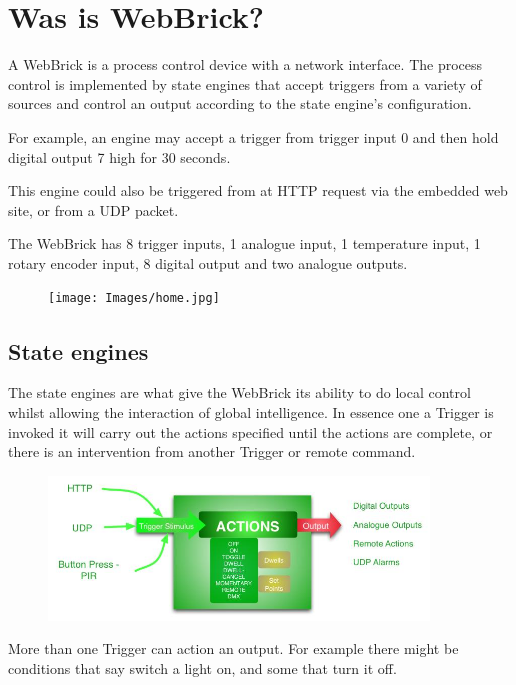 \section {Was is WebBrick?}

A WebBrick is a process control device with a network interface.  The process control is implemented by state engines that accept
triggers  from a variety of sources and control an output according to the state engine's configuration.

For example, an engine may accept a trigger from trigger input 0 and then hold digital output 7 high for 30 seconds.

This engine could also be triggered from at HTTP request via the embedded web site, or from a UDP packet.

The WebBrick has 8 trigger inputs, 1 analogue input, 1 temperature input, 1 rotary encoder input, 8 digital output and two analogue outputs.

\begin{figure}[H]
\centering
\texttt{[image: Images/home.jpg]}
\end{figure}

\subsection{State engines}


    The state engines are what give the WebBrick its ability to do local control whilst allowing the interaction of global intelligence.  In essence one a Trigger is invoked it will carry out the actions specified until the actions are complete, or there is an intervention from another Trigger or remote command.
    
    \begin{figure}[H]
    \centering
    \includegraphics[width=0.9\textwidth]{Images/StateEngineDiag.jpg}
    \end{figure}
    
    More than one Trigger can action an output.  For example there might be conditions that say switch a light on, and some that turn it off.
    
